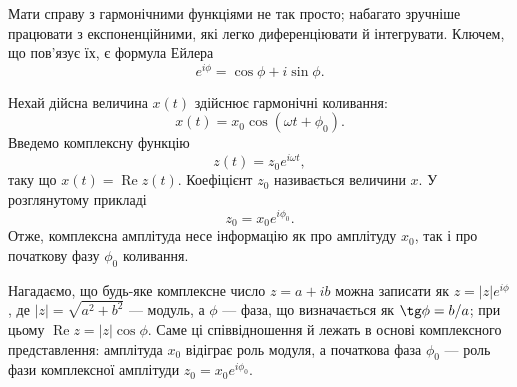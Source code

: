 \begin{Attention}
	Мати справу з гармонічними функціями не так просто; набагато зручніше працювати з експоненційними, які легко диференціювати й інтегрувати. Ключем, що пов'язує їх, є формула Ейлера
	\begin{equation*}
		e^{i\phi} = \cos\phi + i\sin\phi.
	\end{equation*}

	Нехай дійсна величина $x(t)$ здійснює гармонічні коливання:
	\begin{equation}\label{eq:harmonic_real}
		x(t) = x_0 \cos(\omega t + \phi_0).
	\end{equation}
	Введемо комплексну функцію
	\begin{equation}\label{eq:complex_function}
		z(t) = z_0 e^{i\omega t},
	\end{equation}
	таку що $x(t) = \operatorname{Re} z(t)$. Коефіцієнт $z_0$ називається  величини $x$. У розглянутому прикладі
	\begin{equation}\label{eq:complex_amplitude}
		z_0 = x_0 e^{i\phi_0}.
	\end{equation}
	Отже, комплексна амплітуда несе інформацію як про амплітуду $x_0$, так і про початкову фазу $\phi_0$ коливання.

	Нагадаємо, що будь-яке комплексне число $z = a + ib$ можна записати як $z = |z| e^{i\phi}$, де $|z| = \sqrt{a^2 + b^2}$ --- модуль, а $\phi$ --- фаза, що визначається як $\tg\phi = b/a$; при цьому $\operatorname{Re} z = |z|\cos\phi$. Саме ці співвідношення й лежать в основі комплексного представлення: амплітуда $x_0$ відіграє роль модуля, а початкова фаза $\phi_0$ --- роль фази комплексної амплітуди $z_0 = x_0 e^{i\phi_0}$.
\end{Attention}

